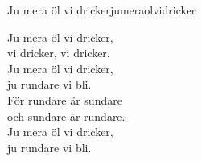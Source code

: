 \begin{song}{Ju mera öl vi dricker}{jumeraolvidricker}
\begin{vers}
Ju mera öl vi dricker,\\
vi dricker, vi dricker.\\
Ju mera öl vi dricker,\\
ju rundare vi bli.\\
För rundare är sundare\\
och sundare är rundare.\\
Ju mera öl vi dricker,\\
ju rundare vi bli.\\
\end{vers}
\end{song}
